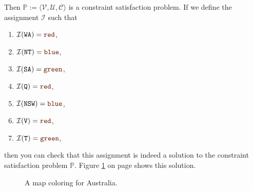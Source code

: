 Then $\mathbb{P} := \langle \mathcal{V}, \mathcal{U}, \mathcal{C} \rangle$ is a constraint satisfaction problem.  
If we define the assignment $\mathcal{I}$ such that
\begin{enumerate}
\item $\mathcal{I}(\mathtt{WA}) = \mytt{red}$,
\item $\mathcal{I}(\mathtt{NT}) = \mytt{blue}$,
\item $\mathcal{I}(\mathtt{SA}) = \mytt{green}$,
\item $\mathcal{I}(\mathtt{Q}) = \mytt{red}$,
\item $\mathcal{I}(\mathtt{NSW}) = \mytt{blue}$,
\item $\mathcal{I}(\mathtt{V}) = \mytt{red}$,
\item $\mathcal{I}(\mathtt{T}) = \mytt{green}$,
\end{enumerate}
then you can check that this assignment  is indeed a solution to the constraint satisfaction problem $\mathbb{P}$.
Figure \ref{fig:australia-solution.png} on page \pageref{fig:australia-solution.png} shows this solution.

\begin{figure}[!ht]
  \centering
  \caption{A map coloring for Australia.}
  \label{fig:australia-solution.png}
\end{figure}


